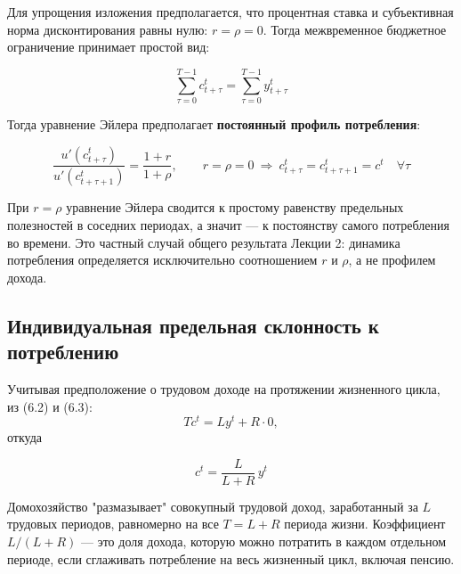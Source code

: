\documentclass[10pt,a4paper]{article}
\begin{document}
Для упрощения изложения предполагается, что процентная ставка и субъективная норма дисконтирования равны нулю: $r=\rho=0$. Тогда межвременное бюджетное ограничение принимает простой вид:
\begin{formulabox}
\begin{equation}
\sum_{\tau=0}^{T-1} c_{t+\tau}^{t} = \sum_{\tau=0}^{T-1} y_{t+\tau}^{t} \tag{6.2}
\end{equation}
\end{formulabox}

Тогда уравнение Эйлера предполагает \textbf{постоянный профиль потребления}:
\begin{formulabox}
\begin{equation}
\frac{u'(c_{t+\tau}^{t})}{u'(c_{t+\tau+1}^{t})} = \frac{1+r}{1+\rho}, \qquad r=\rho=0 \ \Rightarrow\ c_{t+\tau}^{t} = c_{t+\tau+1}^{t} = c^{t} \quad \forall \tau \tag{6.3}
\end{equation}
\end{formulabox}

\begin{intuition}
При $r=\rho$ уравнение Эйлера сводится к простому равенству предельных полезностей в соседних периодах, а значит — к постоянству самого потребления во времени. Это частный случай общего результата Лекции 2: динамика потребления определяется исключительно соотношением $r$ и $\rho$, а не профилем дохода.
\end{intuition}

\subsection{Индивидуальная предельная склонность к потреблению}

Учитывая предположение о трудовом доходе на протяжении жизненного цикла, из (6.2) и (6.3):
$$Tc^{t} = Ly^{t} + R\cdot 0,$$
откуда
\begin{formulabox}
\begin{equation}
c^{t} = \frac{L}{L+R}\,y^{t} \tag{6.4}
\end{equation}
\end{formulabox}

\begin{intuition}
Домохозяйство "размазывает" совокупный трудовой доход, заработанный за $L$ трудовых периодов, равномерно на все $T=L+R$ периода жизни. Коэффициент $L/(L+R)$ — это доля дохода, которую можно потратить в каждом отдельном периоде, если сглаживать потребление на весь жизненный цикл, включая пенсию.
\end{intuition}
\end{document}
